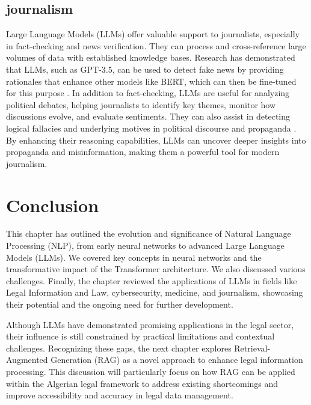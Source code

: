 \subsection{journalism}
Large Language Models (LLMs) offer valuable support to journalists, especially in fact-checking and news verification. They can process and cross-reference large volumes of data with established knowledge bases. Research has demonstrated that LLMs, such as GPT-3.5, can be used to detect fake news by providing rationales that enhance other models like BERT, which can then be fine-tuned for this purpose .
In addition to fact-checking, LLMs are useful for analyzing political debates, helping journalists to identify key themes, monitor how discussions evolve, and evaluate sentiments. They can also assist in detecting logical fallacies and underlying motives in political discourse and propaganda . By enhancing their reasoning capabilities, LLMs can uncover deeper insights into propaganda and misinformation, making them a powerful tool for modern journalism\cite{helwe2024}.
\section{Conclusion}
This chapter has outlined the evolution and significance of Natural Language Processing (NLP), from early neural networks to advanced Large Language Models (LLMs). We covered key concepts in neural networks and the transformative impact of the Transformer architecture. We also discussed various challenges. Finally, the chapter reviewed the applications of LLMs in fields like Legal Information and Law, cybersecurity, medicine, and journalism, showcasing their potential and the ongoing need for further development.

Although LLMs have demonstrated promising applications in the legal sector, their influence is still constrained by practical limitations and contextual challenges. Recognizing these gaps, the next chapter explores Retrieval-Augmented Generation (RAG) as a novel approach to enhance legal information processing. This discussion will particularly focus on how RAG can be applied within the Algerian legal framework to address existing shortcomings and improve accessibility and accuracy in legal data management.
